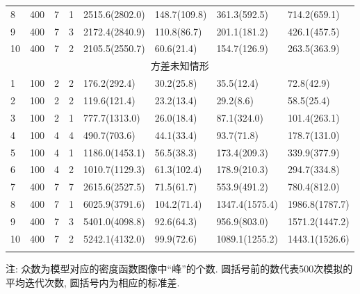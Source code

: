 \documentclass[a4paper,12pt,openany,oneside,utf-8]{ctexbook}
\begin{document}
\begin{table}[htbp]
\begin{tabular}{p{0.74cm}<{\centering} p{0.20cm}<{\centering} p{1.16cm}<{\centering} p{0.74cm}<{\centering} p{2.20cm}<{\centering} p{2.00cm}<{\centering} p{2.20cm}<{\centering} p{2.20cm}<{\centering}}
8 & 400 & 7 & 1 & 2515.6(2802.0) & 148.7(109.8) & 361.3(592.5) & 714.2(659.1) \\
9 & 400 & 7 & 3 & 2172.4(2840.9) & 110.8(86.7) & 201.1(181.2) & 426.1(457.5) \\
10 & 400 & 7 & 2 & 2105.5(2550.7) & 60.6(21.4) & 154.7(126.9) & 263.5(363.9) \\
\multicolumn{8}{c}{方差未知情形} \\%
1 & 100 & 2 & 2 & 176.2(292.4) & 30.2(25.8) & 35.5(12.4) & 72.8(42.9) \\
2 & 100 & 2 & 2 & 119.6(121.4) & 23.2(13.4) & 29.2(8.6) & 58.5(25.4) \\
3 & 100 & 2 & 1 & 777.7(1313.0) & 26.0(18.4) & 87.1(324.0) & 101.4(263.1) \\
4 & 100 & 4 & 4 & 490.7(703.6) & 44.1(33.4) & 93.7(71.8) & 178.7(131.0) \\
5 & 100 & 4 & 1 & 1186.0(1453.1) & 56.5(38.3) & 173.4(209.3) & 339.9(377.9) \\
6 & 100 & 4 & 2 & 1010.7(1129.3) & 61.3(102.4) & 178.9(210.3) & 294.7(334.8) \\
7 & 400 & 7 & 7 & 2615.6(2527.5) & 71.5(61.7) & 553.9(491.2) & 780.4(812.0) \\
8 & 400 & 7 & 1 & 6025.9(3791.6) & 104.2(71.4) & 1347.4(1575.4) & 1986.8(1787.7) \\
9 & 400 & 7 & 3 & 5401.0(4098.8) & 92.6(64.3) & 956.9(803.0) & 1571.2(1447.2) \\
10 & 400 & 7 & 2 & 5242.1(4132.0) & 99.9(72.6) & 1089.1(1255.2) & 1443.1(1526.6) \\
\Xhline{1.0pt}
\end{tabular}
\begin{tablenotes}
  \footnotesize
  \item 注: 众数为模型对应的密度函数图像中“峰”的个数. 圆括号前的数代表500次模拟的平均迭代次数, 圆括号内为相应的标准差.
\end{tablenotes}
\end{table}
\end{document}
